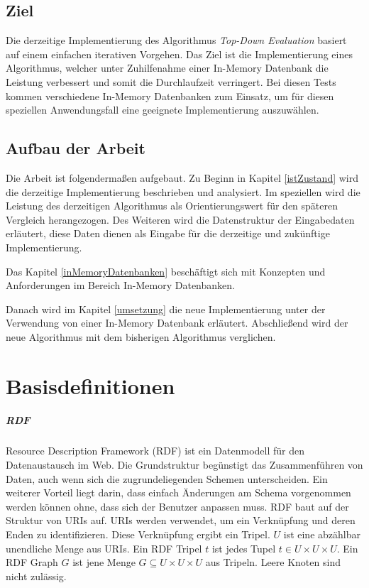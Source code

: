 \documentclass[draft,final]{vutinfth} %
\begin{document}
\section*{Ziel}
Die derzeitige Implementierung des Algorithmus \textit{Top-Down Evaluation} \cite{OptMat} basiert auf einem einfachen iterativen Vorgehen. Das Ziel ist die Implementierung eines Algorithmus, welcher unter Zuhilfenahme einer In-Memory Datenbank die Leistung verbessert und somit die Durchlaufzeit verringert. Bei diesen Tests kommen verschiedene In-Memory Datenbanken zum Einsatz, um für diesen speziellen Anwendungsfall eine geeignete Implementierung auszuwählen.

\section*{Aufbau der Arbeit}
Die Arbeit ist folgenderma{\ss}en aufgebaut. Zu Beginn in Kapitel \ref{istZustand} wird die derzeitige Implementierung beschrieben und analysiert. Im speziellen wird die Leistung des derzeitigen Algorithmus als Orientierungswert für den späteren Vergleich herangezogen. Des Weiteren wird die Datenstruktur der Eingabedaten erläutert, diese Daten dienen als Eingabe für die derzeitige und zukünftige Implementierung.

Das Kapitel \ref{inMemoryDatenbanken} beschäftigt sich mit Konzepten und Anforderungen im Bereich In-Memory Datenbanken. 

Danach wird im Kapitel \ref{umsetzung} die neue Implementierung unter der Verwendung von einer In-Memory Datenbank erläutert. Abschlie{\ss}end wird der neue Algorithmus mit dem bisherigen Algorithmus verglichen.

\chapter{Basisdefinitionen}
\paragraph{RDF}
Resource Description Framework (RDF) ist ein Datenmodell für den Datenaustausch im Web. Die Grundstruktur begünstigt das Zusammenführen von Daten, auch wenn sich die zugrundeliegenden Schemen unterscheiden. Ein weiterer Vorteil liegt darin, dass einfach Änderungen am Schema vorgenommen werden können ohne, dass sich der Benutzer anpassen muss. RDF baut auf der Struktur von URIs auf. URIs werden verwendet, um ein Verknüpfung und deren Enden zu identifizieren. Diese Verknüpfung ergibt ein Tripel.
$U$ ist eine abzählbar unendliche Menge aus URIs. Ein RDF Tripel $t$ ist jedes Tupel $t \in U \times U \times U$. Ein RDF Graph $G$ ist jene Menge $G \subseteq U \times U \times U$ aus Tripeln. Leere Knoten sind nicht zulässig. \\ \cite{rdfSite}  
\end{document}
